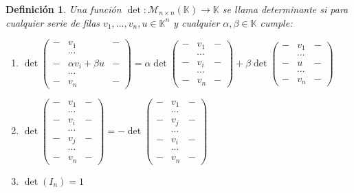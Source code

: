 \documentclass[12pt]{book}
\newtheorem{defi}{Definici\'on}
\def\K{\mathbb{K}}
\begin{document}
\begin{defi}\label{def:det}
  Una función $\det:\mathcal{M}_{n\times n}(\K)\rightarrow \K$ se llama determinante si para cualquier serie de filas $v_1,\dots, v_n,u\in\K^n$ y cualquier $\alpha,\beta\in\K$ cumple:
  \begin{enumerate}
  \item
    $\det
    \left(
    \begin{array}{ccc}
      -&v_1&-\\
      &\cdots&\\
      -&\alpha v_i+\beta u&-\\
      &\cdots&\\
      -&v_n&-
    \end{array}
    \right)=\alpha\det
    \left(
    \begin{array}{ccc}
      -&v_1&-\\
      &\cdots&\\
      -&v_i&-\\
      &\cdots&\\
      -&v_n&-
    \end{array}
    \right)+
    \beta \det\left(
    \begin{array}{ccc}
      -&v_1&-\\
      &\cdots&\\
      -&u&-\\
      &\cdots&\\
      -&v_n&-
    \end{array}\right)$
  \item 
    $\det
    \left(
    \begin{array}{ccc}
      -&v_1&-\\
      &\cdots&\\
      -&v_i&-\\
      &\cdots&\\
      -&v_j&-\\
      &\cdots&\\
      -&v_n&-
    \end{array}
    \right)=
    -\det
    \left(
    \begin{array}{ccc}
      -&v_1&-\\
      &\cdots&\\
      -&v_j&-\\
      &\cdots&\\
      -&v_i&-\\
      &\cdots&\\
      -&v_n&-
    \end{array}
    \right)$
  \item $\det(I_n)=1$
  \end{enumerate}    
\end{defi}
 
\end{document}
